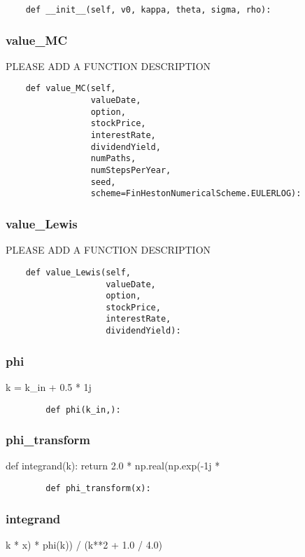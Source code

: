 \documentclass[twoside,11pt]{book}
\begin{document}
\begin{lstlisting}
    def __init__(self, v0, kappa, theta, sigma, rho):
\end{lstlisting}

\subsubsection*{{\bf value\_MC}}
PLEASE ADD A FUNCTION DESCRIPTION

\begin{lstlisting}
    def value_MC(self,
                 valueDate,
                 option,
                 stockPrice,
                 interestRate,
                 dividendYield,
                 numPaths,
                 numStepsPerYear,
                 seed,
                 scheme=FinHestonNumericalScheme.EULERLOG):
\end{lstlisting}

\subsubsection*{{\bf value\_Lewis}}
PLEASE ADD A FUNCTION DESCRIPTION

\begin{lstlisting}
    def value_Lewis(self,
                    valueDate,
                    option,
                    stockPrice,
                    interestRate,
                    dividendYield):
\end{lstlisting}

\subsubsection*{{\bf phi}}
k = k\_in + 0.5 * 1j 

\begin{lstlisting}
        def phi(k_in,):
\end{lstlisting}

\subsubsection*{{\bf phi\_transform}}
def integrand(k): return 2.0 * np.real(np.exp(-1j * \ 

\begin{lstlisting}
        def phi_transform(x):
\end{lstlisting}

\subsubsection*{{\bf integrand}}
k * x) * phi(k)) / (k**2 + 1.0 / 4.0) 
\end{document}

